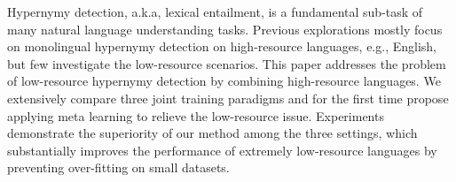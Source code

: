 Hypernymy detection, a.k.a, lexical entailment, is a fundamental sub-task of many natural language understanding tasks. Previous explorations mostly focus on monolingual hypernymy detection on high-resource languages, e.g., English, but few investigate the low-resource scenarios. This paper addresses the problem of low-resource hypernymy detection by combining high-resource languages. We extensively compare three joint training paradigms and for the first time propose applying meta learning to relieve the low-resource issue. Experiments demonstrate the superiority of our method among the three settings, which substantially improves the performance of extremely low-resource languages by preventing over-fitting on small datasets.
